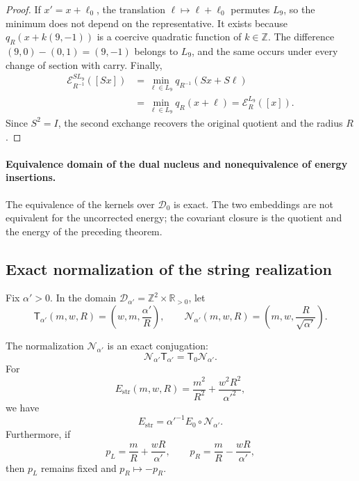 \begin{proof}
If \(x'=x+\ell_0\), the translation
\(\ell\mapsto\ell+\ell_0\) permutes \(L_9\), so the minimum does not depend on the
representative. It exists because \(q_R(x+k(9,-1))\) is a coercive quadratic function
of \(k\in\mathbb Z\). The difference
\((9,0)-(0,1)=(9,-1)\) belongs to \(L_9\), and the same occurs under every change
of section with carry. Finally,
\[
\begin{aligned}
 \mathcal E_{R^{-1}}^{SL_9}([Sx])
 &=\min_{\ell\in L_9}q_{R^{-1}}(Sx+S\ell)\\
 &=\min_{\ell\in L_9}q_R(x+\ell)
 =\mathcal E_R^{L_9}([x]).
\end{aligned}
\]
Since \(S^2=I\), the second exchange recovers the original quotient and the
radius \(R\).
\end{proof}

\paragraph{Equivalence domain of the dual nucleus and nonequivalence of energy insertions.}
The equivalence of the kernels over \(\mathscr D_0\) is exact. The two
embeddings are not equivalent for the uncorrected energy; the covariant
closure is the quotient and the energy of the preceding theorem.

\subsection{Exact normalization of the string realization}

Fix \(\alpha'>0\). In the domain
\(\mathscr D_{\alpha'}=\mathbb Z^2\times\mathbb R_{>0}\), let
\[
 \mathsf T_{\alpha'}(m,w,R)=\left(w,m,\frac{\alpha'}R\right),
 \qquad
 \mathcal N_{\alpha'}(m,w,R)
 =\left(m,w,\frac R{\sqrt{\alpha'}}\right).
\]

\begin{theorem}
\label{thm:cierre-vtm-normalizacion-alpha-t}
The normalization \(\mathcal N_{\alpha'}\) is an exact conjugation:
\[
 \boxed{\mathcal N_{\alpha'}\mathsf T_{\alpha'}
 =\mathsf T_0\mathcal N_{\alpha'}.}
\]
For
\[
 E_{\mathrm{str}}(m,w,R)
 =\frac{m^2}{R^2}+\frac{w^2R^2}{\alpha'^2},
\]
we have
\[
 E_{\mathrm{str}}
 =\alpha'^{-1}E_0\circ\mathcal N_{\alpha'}.
\]
Furthermore, if
\[
 p_L=\frac mR+\frac{wR}{\alpha'},
 \qquad p_R=\frac mR-\frac{wR}{\alpha'},
\]
then \(p_L\) remains fixed and \(p_R\mapsto-p_R\).
\end{theorem}

